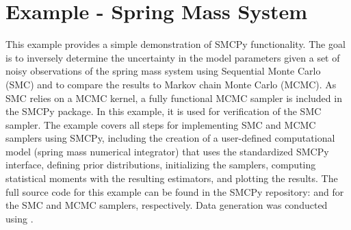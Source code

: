 \documentclass[letterpaper,10pt,english]{sphinxmanual}
\begin{document}
\chapter{Example - Spring Mass System}
\label{\detokenize{example:example-spring-mass-system}}\label{\detokenize{example::doc}}
This example provides a simple demonstration of SMCPy functionality. The goal
is to inversely determine the uncertainty in the model parameters given a set
of noisy observations of the spring mass system using Sequential Monte Carlo
(SMC) and to compare the results to Markov chain Monte Carlo (MCMC). As SMC
relies on a MCMC kernel, a fully functional MCMC sampler is included in the
SMCPy package. In this example, it is used for verification of the SMC sampler.
The example covers all steps for implementing SMC and MCMC samplers using
SMCPy, including the creation of a user-defined computational model (spring
mass numerical integrator) that uses the standardized SMCPy interface, defining
prior distributions, initializing the samplers, computing statistical moments
with the resulting estimators, and plotting the results. The full source code
for this example can be found in the SMCPy repository:
 and
 for the SMC and
MCMC samplers, respectively. Data generation was conducted using
.

\begin{figure}[htbp]
\centering

\noindent{}
\end{figure}
\end{document}
